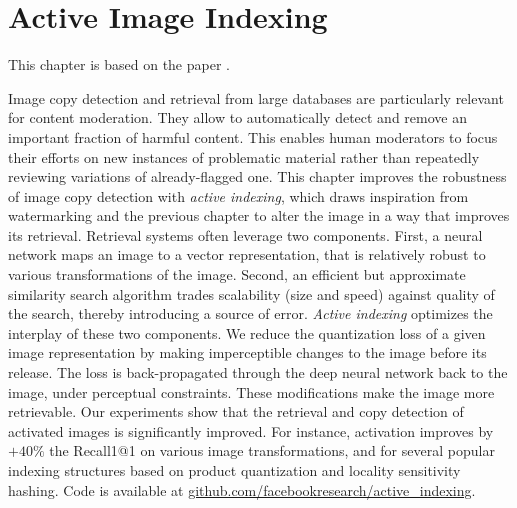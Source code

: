 
\chapter{Active Image Indexing}
\label{chapter:active-indexing}

This chapter is based on the paper .


Image copy detection and retrieval from large databases are particularly relevant for content moderation. 
They allow to automatically detect and remove an important fraction of harmful content.
This enables human moderators to focus their efforts on new instances of problematic material rather than repeatedly reviewing variations of already-flagged one.
This chapter improves the robustness of image copy detection with \emph{active indexing}, which draws inspiration from watermarking and the previous chapter to alter the image in a way that improves its retrieval.
Retrieval systems often leverage two components. 
First, a neural network maps an image to a vector representation, that is relatively robust to various transformations of the image. 
Second, an efficient but approximate similarity search algorithm trades scalability (size and speed) against quality of the search, thereby introducing a source of error. 
\emph{Active indexing} optimizes the interplay of these two components. 
We reduce the quantization loss of a given image representation by making imperceptible changes to the image before its release. 
The loss is back-propagated through the deep neural network back to the image, under perceptual constraints. These modifications make the image more retrievable. 
Our experiments show that the retrieval and copy detection of activated images is significantly improved. For instance, activation improves by $+40\%$ the Recall1@1 on various image transformations, and for several popular indexing structures based on product quantization and locality sensitivity hashing.
Code is available at \url{github.com/facebookresearch/active_indexing}.

\newpage






